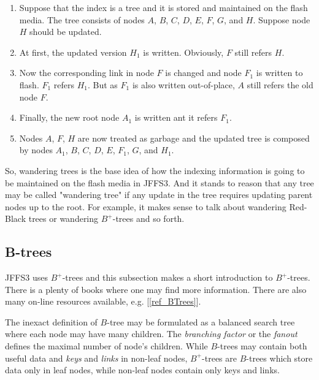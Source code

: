 \begin{enumerate}

\item Suppose that the index is a tree and it is stored and maintained
on the flash media. The tree consists of nodes
$A$, $B$, $C$, $D$, $E$, $F$, $G$, and $H$.
Suppose node $H$ should be updated.

\item At first, the updated version $H_1$ is written. Obviously, $F$ still
refers $H$.

\item Now the corresponding link in node $F$ is changed and node $F_1$ is
written to flash. $F_1$ refers $H_1$. But as $F_1$ is also written
\mbox{out-of-place}, $A$ still refers the old node $F$.

\item Finally, the new root node $A_1$ is written ant it refers $F_1$.

\item Nodes $A$, $F$, $H$ are now treated as garbage and the updated tree is
composed by nodes $A_1$, $B$, $C$, $D$, $E$, $F_1$, $G$, and $H_1$.

\end{enumerate}

So, wandering trees is the base idea of how the indexing information is going
to be maintained on the flash media in JFFS3. And it stands to reason that any
tree may be called "wandering tree" if any update in the tree requires updating
parent nodes up to the root. For example, it makes sense to talk about
wandering \mbox{Red-Black} trees or wandering \mbox{$B^+$-trees} and so forth.

%
%
\subsection{B-trees} \label{ref_SectionBTrees}

JFFS3 uses \mbox{$B^+$-trees} and this subsection makes a short introduction to
\mbox{$B^+$-trees}. There is a plenty of books where one may find more
information. There are also many \mbox{on-line} resources available, e.g.
[\ref{ref_BTrees}].

The inexact definition of \mbox{$B$-tree} may be formulated as a balanced
search tree where each node may have many children. The \emph{branching factor}
or the \emph{fanout} defines the maximal number of node's children. While
\mbox{$B$-trees} may contain both useful data and \emph{keys} and \emph{links}
in \mbox{non-leaf} nodes, \mbox{$B^+$-trees} are \mbox{$B$-trees} which store
data only in leaf nodes, while \mbox{non-leaf} nodes contain only keys and
links.

